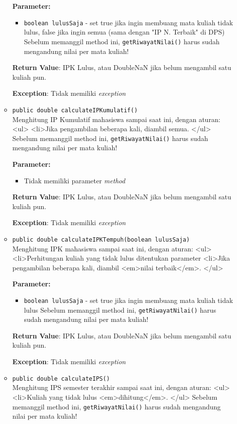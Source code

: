 \documentclass{article}
\begin{document}
\begin{enumerate}
\begin{itemize}
\textbf{Parameter:}
\begin{itemize}
\item \texttt{boolean lulusSaja} - 
set true jika ingin membuang mata kuliah tidak lulus, false jika ingin semua (sama dengan "IP N. Terbaik" di DPS)
 Sebelum memanggil method ini, \texttt{getRiwayatNilai()} harus sudah mengandung nilai per mata kuliah!
\end{itemize}
\textbf{Return Value}: IPK Lulus, atau  DoubleNaN jika belum mengambil satu kuliah pun.

\textbf{Exception}: Tidak memiliki \textit{exception}

\item \texttt{public double calculateIPKumulatif()}\\ 
Menghitung IP Kumulatif mahasiswa sampai saat ini, dengan aturan:
 <ul>
   <li>Jika pengambilan beberapa kali, diambil semua.
 </ul>
 Sebelum memanggil method ini, \texttt{getRiwayatNilai()} harus sudah mengandung nilai per mata kuliah!

\textbf{Parameter:}\begin{itemize}
\item Tidak memiliki parameter \textit{method}
\end{itemize}
\textbf{Return Value}: IPK Lulus, atau  DoubleNaN jika belum mengambil satu kuliah pun.

\textbf{Exception}: Tidak memiliki \textit{exception}

\item \texttt{public double calculateIPKTempuh(boolean lulusSaja)}\\ 
Menghitung IPK mahasiswa sampai saat ini, dengan aturan:
 <ul>
   <li>Perhitungan kuliah yang tidak lulus ditentukan parameter
   <li>Jika pengambilan beberapa kali, diambil <em>nilai terbaik</em>.
 </ul>

\textbf{Parameter:}
\begin{itemize}
\item \texttt{boolean lulusSaja} - 
set true jika ingin membuang mata kuliah tidak lulus 
 Sebelum memanggil method ini, \texttt{getRiwayatNilai()} harus sudah mengandung nilai per mata kuliah!
\end{itemize}
\textbf{Return Value}: IPK Lulus, atau  DoubleNaN jika belum mengambil satu kuliah pun.

\textbf{Exception}: Tidak memiliki \textit{exception}

\item \texttt{public double calculateIPS()}\\ 
Menghitung IPS semester terakhir sampai saat ini, dengan aturan:
 <ul>
   <li>Kuliah yang tidak lulus <em>dihitung</em>.
 </ul>
 Sebelum memanggil method ini, \texttt{getRiwayatNilai()} harus sudah mengandung nilai per mata kuliah!


\end{itemize}
\end{enumerate}
\end{document}
